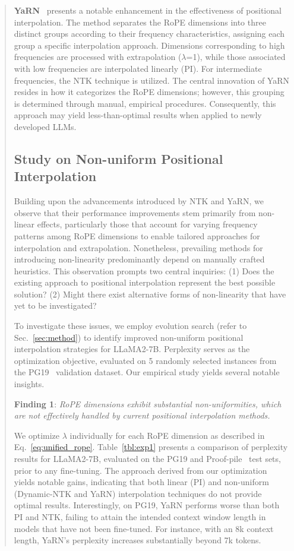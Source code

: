 \begin{abstract}
\textbf{YaRN}~\cite{yarn} presents a notable enhancement in the effectiveness of positional interpolation. The method separates the RoPE dimensions into three distinct groups according to their frequency characteristics, assigning each group a specific interpolation approach. Dimensions corresponding to high frequencies are processed with extrapolation ($\lambda$=1), while those associated with low frequencies are interpolated linearly (PI). For intermediate frequencies, the NTK technique is utilized. The central innovation of YaRN resides in how it categorizes the RoPE dimensions; however, this grouping is determined through manual, empirical procedures. Consequently, this approach may yield less-than-optimal results when applied to newly developed LLMs.

\subsection{Study on Non-uniform Positional Interpolation}

Building upon the advancements introduced by NTK and YaRN, we observe that their performance improvements stem primarily from non-linear effects, particularly those that account for varying frequency patterns among RoPE dimensions to enable tailored approaches for interpolation and extrapolation. Nonetheless, prevailing methods for introducing non-linearity predominantly depend on manually crafted heuristics. This observation prompts two central inquiries: (1) Does the existing approach to positional interpolation represent the best possible solution? (2) Might there exist alternative forms of non-linearity that have yet to be investigated?

To investigate these issues, we employ evolution search (refer to Sec.~\ref{sec:method}) to identify improved non-uniform positional interpolation strategies for LLaMA2-7B. Perplexity serves as the optimization objective, evaluated on 5 randomly selected instances from the PG19~\cite{pg19} validation dataset. Our empirical study yields several notable insights.

\textbf{Finding 1}: \textit{RoPE dimensions exhibit substantial non-uniformities, which are not effectively handled by current positional interpolation methods.}

We optimize $\lambda$ individually for each RoPE dimension as described in Eq.~\ref{eq:unified_rope}. Table~\ref{tbl:exp1} presents a comparison of perplexity results for LLaMA2-7B, evaluated on the PG19 and Proof-pile~\cite{proof-pile} test sets, prior to any fine-tuning. The approach derived from our optimization yields notable gains, indicating that both linear (PI) and non-uniform (Dynamic-NTK and YaRN) interpolation techniques do not provide optimal results. Interestingly, on PG19, YaRN performs worse than both PI and NTK, failing to attain the intended context window length in models that have not been fine-tuned. For instance, with an 8k context length, YaRN’s perplexity increases substantially beyond 7k tokens.


\end{abstract}
